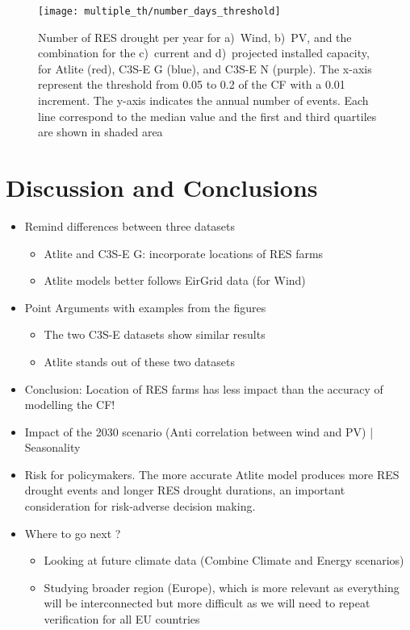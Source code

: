 \documentclass[a4paper, 11pt]{article}
\begin{document}
\begin{figure}[!ht]
	\centering
	\texttt{[image: multiple\_th/number\_days\_threshold]}
	\caption{Number of RES drought per year for a)~Wind, b)~PV, and the combination for the c)~current and d)~projected installed capacity, for Atlite (red), C3S-E G (blue), and C3S-E N (purple). The x-axis represent the threshold from 0.05 to 0.2 of the CF with a 0.01 increment. The y-axis indicates the annual number of events. Each line correspond to the median value and the first and third quartiles are shown in shaded area}
	\label{fig:number_days_threshold}
\end{figure}

\newpage
\section{Discussion and Conclusions}
\label{sec:DiscConc}

\begin{itemize}
	\item Remind differences between three datasets
	\begin{itemize}
		\item Atlite and C3S-E G: incorporate locations of RES farms
		\item Atlite models better follows EirGrid data (for Wind)
	\end{itemize}
	\item Point Arguments with examples from the figures
	\begin{itemize}
		\item The two C3S-E datasets show similar results
		\item Atlite stands out of these two datasets
	\end{itemize}
	\item Conclusion: Location of RES farms has less impact than the accuracy of modelling the CF!
	\\
	\item Impact of the 2030 scenario (Anti correlation between wind and PV) | Seasonality
	\\
	\item Risk for policymakers. The more accurate Atlite model produces more RES drought events and longer RES drought durations, an important consideration for risk-adverse decision making.
	\\
	\item Where to go next ?
	\begin{itemize}
		\item Looking at future climate data (Combine Climate and Energy scenarios)
		\item Studying broader region (Europe), which is more relevant as everything will be interconnected but more difficult as we will need to repeat verification for all EU countries
	\end{itemize}
\end{itemize}
\end{document}
